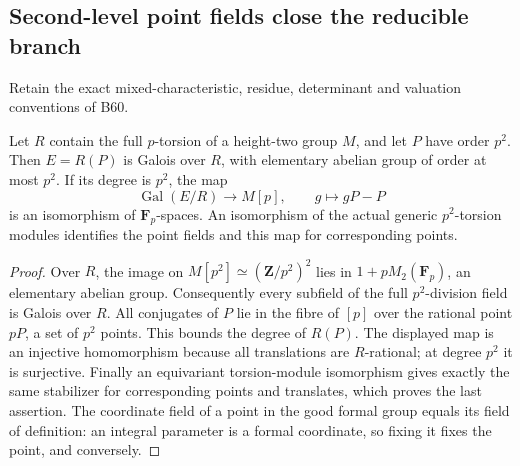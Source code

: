\subsection{Second-level point fields close the reducible branch}

Retain the exact mixed-characteristic, residue, determinant and
valuation conventions of B60.

\begin{lemma}
\label{lem:B-RD61-point-field}
Let $R$ contain the full $p$-torsion of a height-two group $M$, and
let $P$ have order $p^2$. Then $E=R(P)$ is Galois over $R$, with
elementary abelian group of order at most $p^2$. If its degree is
$p^2$, the map
\[
       \operatorname{Gal}(E/R)\longrightarrow M[p],
                       \qquad g\longmapsto gP-P        \tag{B-RD61.1}
\]
is an isomorphism of $\mathbf F_p$-spaces. An isomorphism of the
actual generic $p^2$-torsion modules identifies the point fields
and this map for corresponding points.
\end{lemma}
\begin{proof}
Over $R$, the image on $M[p^2]\simeq(\mathbf Z/p^2)^2$ lies
in $1+pM_2(\mathbf F_p)$, an elementary abelian group.
Consequently every subfield of the full $p^2$-division field is
Galois over $R$. All conjugates of $P$ lie in the fibre of $[p]$
over the rational point $pP$, a set of $p^2$ points. This bounds
the degree of $R(P)$. The displayed map is an injective homomorphism
because all translations are $R$-rational; at degree $p^2$ it is
surjective. Finally an equivariant torsion-module isomorphism gives
exactly the same stabilizer for corresponding points and translates,
which proves the last assertion. The coordinate field of a point
in the good formal group equals its field of definition: an
integral parameter is a formal coordinate, so fixing it fixes the
point, and conversely.
\end{proof}

